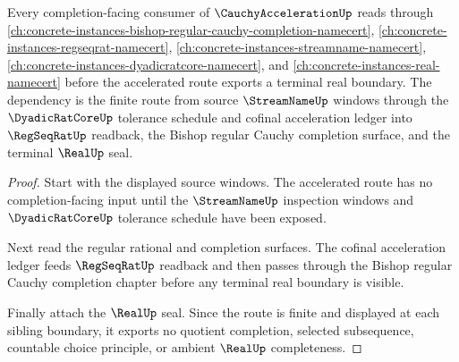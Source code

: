 \begin{theorem}
\label{thm:cauchy-acceleration-completion-forward-link}
Every completion-facing consumer of $\CauchyAccelerationUp$ reads through \autoref{ch:concrete-instances-bishop-regular-cauchy-completion-namecert}, \autoref{ch:concrete-instances-regseqrat-namecert}, \autoref{ch:concrete-instances-streamname-namecert}, \autoref{ch:concrete-instances-dyadicratcore-namecert}, and \autoref{ch:concrete-instances-real-namecert} before the accelerated route exports a terminal real boundary. The dependency is the finite route from source $\StreamNameUp$ windows through the $\DyadicRatCoreUp$ tolerance schedule and cofinal acceleration ledger into $\RegSeqRatUp$ readback, the Bishop regular Cauchy completion surface, and the terminal $\RealUp$ seal.
\end{theorem}
\begin{proof}
Start with the displayed source windows. The accelerated route has no completion-facing input until the $\StreamNameUp$ inspection windows and $\DyadicRatCoreUp$ tolerance schedule have been exposed.

Next read the regular rational and completion surfaces. The cofinal acceleration ledger feeds $\RegSeqRatUp$ readback and then passes through the Bishop regular Cauchy completion chapter before any terminal real boundary is visible.

Finally attach the $\RealUp$ seal. Since the route is finite and displayed at each sibling boundary, it exports no quotient completion, selected subsequence, countable choice principle, or ambient $\RealUp$ completeness.
\end{proof}
